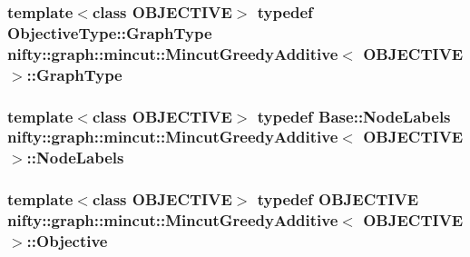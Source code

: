 \subsubsection[{Graph\+Type}]{\setlength{\rightskip}{0pt plus 5cm}template$<$class O\+B\+J\+E\+C\+T\+I\+V\+E$>$ typedef Objective\+Type\+::\+Graph\+Type {\bf nifty\+::graph\+::mincut\+::\+Mincut\+Greedy\+Additive}$<$ O\+B\+J\+E\+C\+T\+I\+V\+E $>$\+::{\bf Graph\+Type}}\label{classnifty_1_1graph_1_1mincut_1_1MincutGreedyAdditive_a791534df9aec04248e1931ca6c2cf764}
\hypertarget{classnifty_1_1graph_1_1mincut_1_1MincutGreedyAdditive_a462b79779cfbe6ddd82b9e85097ddd3c}{}
\subsubsection[{Node\+Labels}]{\setlength{\rightskip}{0pt plus 5cm}template$<$class O\+B\+J\+E\+C\+T\+I\+V\+E$>$ typedef {\bf Base\+::\+Node\+Labels} {\bf nifty\+::graph\+::mincut\+::\+Mincut\+Greedy\+Additive}$<$ O\+B\+J\+E\+C\+T\+I\+V\+E $>$\+::{\bf Node\+Labels}}\label{classnifty_1_1graph_1_1mincut_1_1MincutGreedyAdditive_a462b79779cfbe6ddd82b9e85097ddd3c}
\hypertarget{classnifty_1_1graph_1_1mincut_1_1MincutGreedyAdditive_a53eab6ae6b54a84335e3715d197c203b}{}
\subsubsection[{Objective}]{\setlength{\rightskip}{0pt plus 5cm}template$<$class O\+B\+J\+E\+C\+T\+I\+V\+E$>$ typedef O\+B\+J\+E\+C\+T\+I\+V\+E {\bf nifty\+::graph\+::mincut\+::\+Mincut\+Greedy\+Additive}$<$ O\+B\+J\+E\+C\+T\+I\+V\+E $>$\+::{\bf Objective}}\label{classnifty_1_1graph_1_1mincut_1_1MincutGreedyAdditive_a53eab6ae6b54a84335e3715d197c203b}
\hypertarget{classnifty_1_1graph_1_1mincut_1_1MincutGreedyAdditive_a589ceb1dbedf182e2b557ce930cd0e88}{}
